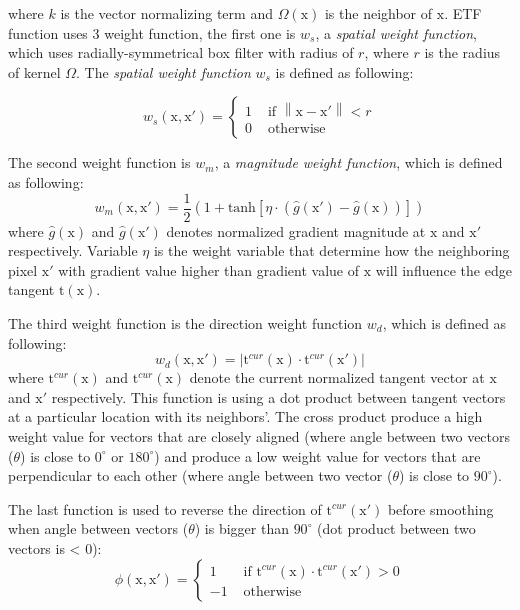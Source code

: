 where $ k $ is the vector normalizing term and $\Omega(\mbox{x})$ is the neighbor of $\mbox{x}$. ETF function uses 3 weight function, the first one is $w_s$, a \textit{spatial weight function}, which uses radially-symmetrical box filter with radius of $r$, where $r$ is the radius of kernel $\Omega$. The \textit{spatial weight  function} $w_s$ is defined as following:

\newcommand{\norm}[1]{\left\| #1 \right\|}
\begin{equation}
	w_s(\mbox{x}, \mbox{x}') = 
	\left\{
		\begin{array}{ll}
			1&\mbox{ if }\norm{\mbox{x} - \mbox{x}'} < r
			\\0&\mbox{ otherwise }
		\end{array}
	\right.
\end{equation}

The second weight function is $w_m$, a \textit{magnitude weight function}, which is defined as following:
\begin{equation}
	w_m(\mbox{x}, \mbox{x}') = \frac{1}{2} (1 + \textrm{tanh}[\eta \cdot (\hat{g}(\mbox{x}') - \hat{g}(\mbox{x}) )])
\end{equation}
where $\hat{g}(\mbox{x})$ and $\hat{g}(\mbox{x}')$ denotes normalized gradient magnitude at $\mbox{x}$ and $\mbox{x}'$ respectively. Variable $\eta$ is the weight variable that determine how the neighboring pixel $\mbox{x}'$ with gradient value higher than gradient value of $\mbox{x}$ will influence the edge tangent $\mbox{t}(\mbox{x})$. 

The third weight function is the direction weight function $w_d$, which is defined as following:
\begin{equation}
	w_d(\mbox{x}, \mbox{x}') = |\mbox{t}^{cur}(\mbox{x})\cdot \mbox{t}^{cur}(\mbox{x}')|
\end{equation}
where $\mbox{t}^{cur}(\mbox{x})$ and $\mbox{t}^{cur}(\mbox{x})$ denote the current normalized tangent vector at $\mbox{x}$ and $\mbox{x}'$ respectively. This function is using a dot product between tangent vectors at a particular location with its neighbors'. The cross product produce a high weight value for vectors that are closely aligned (where angle between two vectors ($\theta$) is close to $0^{\circ}$ or $180^{\circ}$) and produce a low weight value for vectors that are perpendicular to each other (where angle between two vector ($\theta$) is close to $90^{\circ}$).

The last function is used to reverse the direction of $\mbox{t}^{cur}(\mbox{x}')$ before smoothing when angle between vectors ($\theta$) is bigger than $90^{\circ}$ (dot product between two vectors is < 0):
\begin{equation}
	\phi(\mbox{x}, \mbox{x}') = 
	\left\{
		\begin{array}{ll}
			1&\mbox{ if }\mbox{t}^{cur}(\mbox{x})\cdot \mbox{t}^{cur}(\mbox{x}') > 0
			\\-1&\mbox{ otherwise }
		\end{array}
	\right.
\end{equation}

